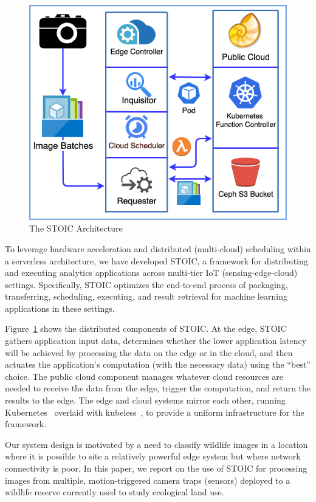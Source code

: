 \begin{figure}
    \centering
    \includegraphics[scale=0.5]{figures/STOIC.png}
    \caption{The STOIC Architecture \label{fig:STOIC}}
\end{figure}


To leverage hardware acceleration and distributed (multi-cloud) scheduling within a serverless architecture, we have developed STOIC, a framework for distributing and executing analytics applications across multi-tier IoT (sensing-edge-cloud) settings. Specifically, STO\-IC optimizes the end-to-end process of packaging, transferring, scheduling, executing, and result retrieval for machine learning applications in these settings.  

Figure~\ref{fig:STOIC} shows the distributed components of STOIC. At the edge, STOIC gathers application input data, determines whether the lower application latency will be achieved by processing the data on the edge or in the cloud, and then actuates the application's computation (with the necessary data) using the ``best'' choice. The public cloud component manages whatever cloud resources are needed to receive the data from the edge, trigger the computation, and return the results to the edge.  The edge and cloud systems mirror each other, running Kubernetes~\cite{ref:k8s-web,ref:k8s} overlaid with kubeless~\cite{ref:kubeless}, to provide a uniform infrastructure for the framework.

Our system design is motivated by a need to classify wildlife images in a location where it is possible to site a relatively powerful edge system but where network connectivity is poor.  In this paper, we report on the use of STOIC  for processing images from multiple, motion-triggered camera traps (sensors) deployed to a wildlife reserve currently used to study ecological land use.

